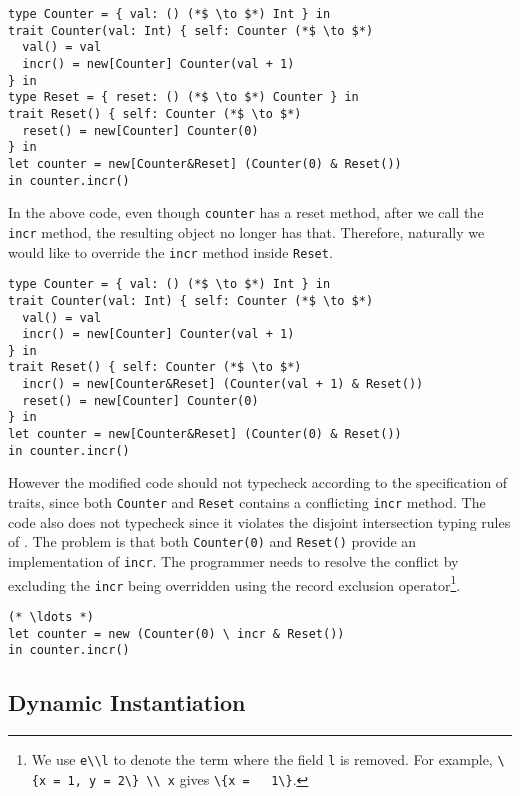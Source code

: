 \begin{lstlisting}
type Counter = { val: () (*$ \to $*) Int } in
trait Counter(val: Int) { self: Counter (*$ \to $*)
  val() = val
  incr() = new[Counter] Counter(val + 1)
} in
type Reset = { reset: () (*$ \to $*) Counter } in
trait Reset() { self: Counter (*$ \to $*)
  reset() = new[Counter] Counter(0)
} in
let counter = new[Counter&Reset] (Counter(0) & Reset())
in counter.incr()
\end{lstlisting}

In the above code, even though \lstinline$counter$ has a reset method, after we
call the \lstinline$incr$ method, the resulting object no longer has that.
Therefore, naturally we would like to override the \lstinline$incr$ method
inside \lstinline$Reset$.

\begin{lstlisting}
type Counter = { val: () (*$ \to $*) Int } in
trait Counter(val: Int) { self: Counter (*$ \to $*)
  val() = val
  incr() = new[Counter] Counter(val + 1)
} in
trait Reset() { self: Counter (*$ \to $*)
  incr() = new[Counter&Reset] (Counter(val + 1) & Reset())
  reset() = new[Counter] Counter(0)
} in
let counter = new[Counter&Reset] (Counter(0) & Reset())
in counter.incr()
\end{lstlisting}

However the modified code should not typecheck according to the
specification of traits, since both \lstinline$Counter$ and
\lstinline$Reset$ contains a conflicting \lstinline$incr$ method. The
code also does not typecheck since it violates the disjoint
intersection typing rules of \name. The problem is that both
\lstinline$Counter(0)$ and \lstinline$Reset()$ provide an
implementation of \lstinline$incr$. The programmer needs to resolve
the conflict by excluding the \lstinline$incr$ being overridden using
the record exclusion operator\footnote{We use \lstinline$e\\l$ to
  denote the term where the field \lstinline$l$ is removed. For
  example, \lstinline$\{x = 1, y = 2\} \\ x$ gives \lstinline$\{x =
  1\}$.}.

\begin{lstlisting}
(* \ldots *)
let counter = new (Counter(0) \ incr & Reset())
in counter.incr()
\end{lstlisting}

\subsection{Dynamic Instantiation}

